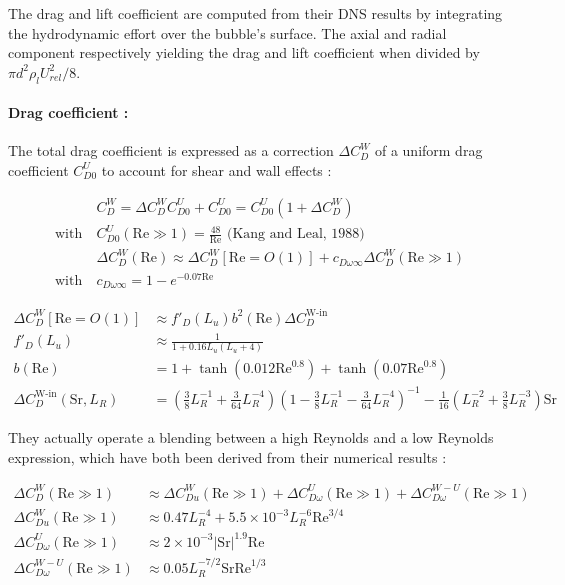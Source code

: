 The drag and lift coefficient are computed from their DNS results by integrating the hydrodynamic effort over the bubble's surface. The axial and radial component respectively yielding the drag and lift coefficient when divided by $\pi d^{2}\rho_{l}U_{rel}^{2}/8$.

\npar

\paragraph{Drag coefficient :}

The total drag coefficient is expressed as a correction $\Delta C_{D}^{W}$ of a uniform drag coefficient $C_{D0}^{U}$ to account for shear and wall effects :


\begin{align}
&C_{D}^{W}=\Delta C_{D}^{W} C_{D0}^{U} + C_{D0}^{U} = C_{D0}^{U} \left( 1 + \Delta C_{D}^{W}\right)\\
\text{with}\  &C_{D0}^{U}\left(\text{Re} \gg 1 \right) = \frac{48}{\text{Re}} \text{ (Kang and Leal, 1988)}\\
&\Delta C_{D}^{W} \left(\text{Re}\right) \approx \Delta C_{D}^{W}\left[\text{Re}=O(1)\right] + c_{D\omega\infty}\Delta C_{D}^{W}\left(\text{Re}\gg1\right)\\
\text{with}\  &c_{D\omega\infty}=1-e^{-0.07\text{Re}}
\end{align}

\npar
\begin{align}
\Delta C_{D}^{W}\left[\text{Re}=O(1)\right] &\approx f'_{D}\left(L_{u}\right)b^{2}\left(\text{Re}\right)\Delta C_{D}^{\text{W-in}}\\
f'_{D}\left(L_{u}\right)&\approx \frac{1}{1+0.16L_{u}\left(L_{u}+4\right)} \\
b\left(\text{Re}\right)&= 1 + \tanh\left(0.012\text{Re}^{0.8}\right)+\tanh\left(0.07\text{Re}^{0.8}\right) \\
\Delta C_{D}^{\text{W-in}}\left(\text{Sr},L_{R}\right)&=\left(\frac{3}{8}L_{R}^{-1} + \frac{3}{64}L_{R}^{-4}\right) \left(1- \frac{3}{8}L_{R}^{-1}-\frac{3}{64}L_{R}^{-4}\right)^{-1} - \frac{1}{16}\left(L_{R}^{-2}+\frac{3}{8}L_{R}^{-3}\right)\text{Sr}
\end{align}

They actually operate a blending between a high Reynolds and a low Reynolds expression, which have both been derived from their numerical results :

\npar
\begin{align}
\Delta C_{D}^{W}\left(\text{Re}\gg1 \right) &\approx \Delta C_{Du}^{W}\left(\text{Re}\gg1\right) + \Delta C_{D\omega}^{U}\left(\text{Re}\gg1\right) + \Delta C_{D\omega}^{W-U}\left(\text{Re}\gg1\right)\\
\Delta C_{Du}^{W}\left(\text{Re}\gg1\right) &\approx 0.47L_{R}^{-4}+5.5\times 10^{-3}L_{R}^{-6}\text{Re}^{3/4} \\
\Delta C_{D\omega}^{U}\left(\text{Re}\gg1\right) &\approx 2 \times 10^{-3} \left|\text{Sr}\right|^{1.9}\text{Re} \\
\Delta C_{D\omega}^{W-U}\left(\text{Re}\gg1\right)&\approx 0.05L_{R}^{-7/2}\text{Sr}\text{Re}^{1/3}
\end{align}


